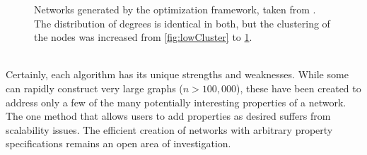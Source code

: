 \documentclass[11pt]{article}
\begin{document}
\begin{figure}[h!]
\begin{subfigure}{.35\textwidth}
    \caption{}
    \label{fig:highCluster}
  \end{subfigure}%
  \caption{Networks generated by the optimization framework, taken from \cite{karthikopt}. The distribution of degrees is identical in both, but the clustering of the nodes was increased from \ref{fig:lowCluster} to \ref{fig:highCluster}.}
  \label{fig:optCluster}
\end{figure}

\vspace{1mm}\\
\indent Certainly, each algorithm has its unique strengths and weaknesses. While some can rapidly construct very large graphs ($n>100,000$), these have been created to address only a few of the many potentially interesting properties of a network. The one method that allows users to add properties as desired suffers from scalability issues. The efficient creation of networks with arbitrary property specifications remains an open area of investigation.
\end{document}
